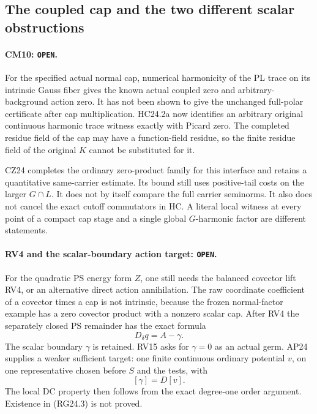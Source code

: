\subsection{The coupled cap and the two different scalar obstructions}

\paragraph{CM10: \texttt{OPEN}.}
For the specified actual normal cap, numerical harmonicity of
the PL trace on its intrinsic Gauss fiber gives the known actual
coupled zero and arbitrary-background action zero.  It has not
been shown to give the unchanged full-polar certificate after
cap multiplication.  HC24.2a now identifies an arbitrary original
continuous harmonic trace witness exactly with Picard zero.
The completed residue field of the cap may have a function-field
residue, so the finite residue field of the original \(K\)
cannot be substituted for it.

CZ24 completes the ordinary zero-product family for this
interface and retains a quantitative same-carrier estimate.
Its bound still uses positive-tail costs on the larger
\(G\cap L\).  It does not by itself compare the full carrier
seminorms.  It also does not cancel the exact cutoff commutators
in HC.  A literal local witness at every point of a compact cap
stage and a single global \(G\)-harmonic factor are different
statements.

\paragraph{RV4 and the scalar-boundary action target: \texttt{OPEN}.}
For the quadratic PS energy form \(Z\), one still needs the
balanced covector lift RV4, or an alternative direct action
annihilation.  The raw coordinate coefficient of a covector
times a cap is not intrinsic, because the frozen normal-factor
example has a zero covector product with a nonzero scalar cap.
After RV4 the separately closed PS remainder has the exact
formula
\[
                 D_\delta q=A-\gamma .                    \tag{RG24.2}
\]
The scalar boundary \(\gamma\) is retained.
RV15 asks for \(\gamma=0\) as an actual germ.  AP24 supplies
a weaker sufficient target: one finite continuous ordinary
potential \(v\), on one representative chosen before \(S\)
and the tests, with
\[
                            [\gamma]=D[v].                 \tag{RG24.3}
\]
The local DC property then follows from the exact degree-one
order argument.  Existence in (RG24.3) is not proved.

